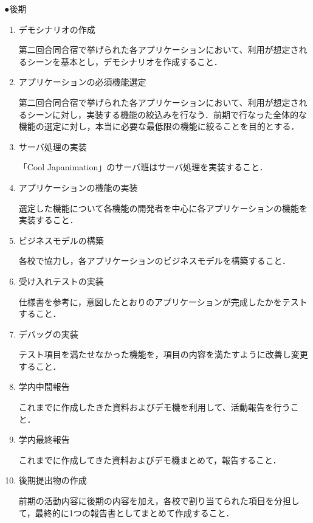 \par ●後期
\begin{enumerate}
\item デモシナリオの作成
\par 第二回合同合宿で挙げられた各アプリケーションにおいて、利用が想定されるシーンを基本とし，デモシナリオを作成すること．
\item アプリケーションの必須機能選定
\par 第二回合同合宿で挙げられた各アプリケーションにおいて、利用が想定されるシーンに対し，実装する機能の絞込みを行なう．前期で行なった全体的な機能の選定に対し，本当に必要な最低限の機能に絞ることを目的とする．
\item サーバ処理の実装
\par 「Cool Japanimation」のサーバ班はサーバ処理を実装すること．
\item アプリケーションの機能の実装
\par 選定した機能について各機能の開発者を中心に各アプリケーションの機能を実装すること．
\item ビジネスモデルの構築
\par 各校で協力し，各アプリケーションのビジネスモデルを構築すること．
\item 受け入れテストの実装
\par 仕様書を参考に，意図したとおりのアプリケーションが完成したかをテストすること．
\item デバッグの実装
\par テスト項目を満たせなかった機能を，項目の内容を満たすように改善し変更すること．
\item 学内中間報告
\par これまでに作成したきた資料およびデモ機を利用して、活動報告を行うこと．
\item 学内最終報告
\par これまでに作成してきた資料およびデモ機まとめて，報告すること． 
\item 後期提出物の作成
\par 前期の活動内容に後期の内容を加え，各校で割り当てられた項目を分担して，最終的に1つの報告書としてまとめて作成すること．
\end{enumerate}
